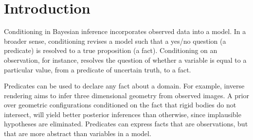 
\section{Introduction}

Conditioning in Bayesian inference incorporates observed data into a model.
In a broader sense, conditioning revises a model such that a yes/no question (a predicate) is resolved to a true proposition (a fact).
Conditioning on an observation, for instance, resolves the question of whether a variable is equal to a particular value, from a predicate of uncertain truth, to a fact.

% 
% 
% 
% 
% 
Predicates can be used to declare any fact about a domain. For example, inverse rendering  \cite{marschner1998inverse,kulkarni2015deep} aims to infer three dimensional geometry from observed images.
A prior over geometric configurations conditioned on the fact that rigid bodies do not intersect,  will yield better posterior inferences than otherwise, since implausible hypotheses are eliminated.
Predicates can express facts that are observations, but that are more abstract than variables	 in a model.
